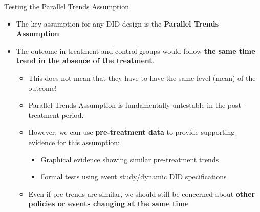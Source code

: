 \documentclass[dvipsnames,hyperref={pdfpagelabels=false}]{beamer}
\begin{document}





\date
{}


\begin{frame}{}
	\titlepage
\end{frame}





\begin{frame}{Testing the Parallel Trends Assumption}{}
	\begin{itemize}
		\item The key assumption for any DID design is the \textbf{Parallel Trends Assumption}
		\vspace{0.2cm}
		\item The outcome in treatment and control groups would follow \textbf{the same time trend in the absence of the treatment}.
		\vspace{0.2cm}
		\begin{itemize}
			\item This does not mean that they have to have the same level (mean) of the outcome!
			\vspace{0.2cm}
			\item Parallel Trends Assumption is fundamentally untestable in the post-treatment period.
			\vspace{0.2cm}
			\item However, we can use \textbf{pre-treatment data} to provide supporting evidence for this assumption:
			\vspace{0.2cm}
			\begin{itemize}
				\item Graphical evidence showing similar pre-treatment trends
				\vspace{0.2cm}
				\item Formal tests using event study/dynamic DID specifications
								\vspace{0.2cm}
			\end{itemize}
			\item Even if pre-trends are similar, we should still be concerned about \textbf{other policies or events changing at the same time}
		\end{itemize}
	\end{itemize}
\end{frame}
\end{document}
